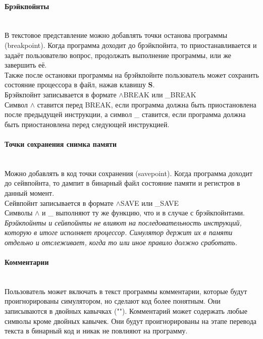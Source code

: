 \paragraph{Брэйкпойнты}~\\
В текстовое представление можно добавлять точки останова программы (breakpoint). Когда программа доходит до брэйкпойнта, то приостанавливается и задаёт пользователю вопрос, продолжать выполнение программы, или же завершить её.\\
Также после остановки программы на брэйкпойнте пользователь может сохранить состояние процессора в файл, нажав клавишу \textbf{S}. \\
Брэйкпойнт записывается в формате $\wedge$BREAK или \_BREAK \\
Символ $\wedge$ ставится перед BREAK, если программа должна быть приостановлена после предыдущей инструкции, а символ \_ ставится, если программа должна быть приостановлена перед следующей инструкцией.

\paragraph{Точки сохранения снимка памяти}~\\
Можно добавлять в код точки сохранения (savepoint). Когда программа доходит до сейвпойнта, то дампит в бинарный файл состояние памяти и регистров в данный момент.\\
Сейвпойнт записывается в формате $\wedge$SAVE или \_SAVE \\
Символы $\wedge$ и \_ выполняют ту же функцию, что и в случае с брэйкпойнтами. \\

{ \it \large
Брэйкпойнты и сейвпойнты не влияют на последовательность инструкций, которую в итоге исполняет процессор. Симулятор держит их в памяти отдельно и отслеживает, когда то или иное правило должно сработать.
}
\\

\paragraph{Комментарии}~\\
Пользователь может включать в текст программы комментарии, которые будут проигнорированы симулятором, но сделают код более понятным. Они записываются в двойных кавычках ("\space"). Комментарий может содержать любые символы кроме двойных кавычек.
Они будут проигнорированы на этапе перевода текста в бинарный код и никак не повлияют на программу.


